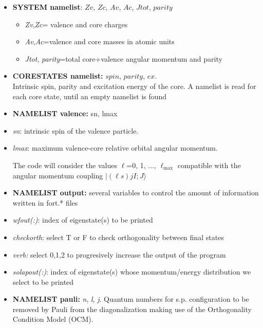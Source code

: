 \documentclass[preprint,12pt]{elsarticle}
\begin{document}
\begin{itemize}
\item \textbf{SYSTEM namelist}:  $Zv$, $Zc$, $Av$, $Ac$, $Jtot$, $parity$ 
\begin{itemize}
\item  {\it Zv},{\it Zc}= valence and core  charges
\item {\it Av},{\it Ac}=valence and core masses in atomic units
\item {\it Jtot}, {\it parity}=total core+valence angular momentum and parity
\end{itemize}



\item \textbf{CORESTATES namelist:} $spin$, $parity$, $ex$. \\ Intrinsic spin, parity and excitation energy of the core.
            A namelist is read for each core state, until an empty namelist is found \\

\item \textbf{NAMELIST valence:} sn, lmax
\bi
\item {\it sn}: intrinsic spin of the valence particle.
\item {\it lmax}: maximum valence-core relative orbital angular momentum. 
\ei
   
   The code will consider the values $\ell$=0, 1, $\ldots$, $\ell_\mathrm{max}$ compatible with the angular momentum coupling 
              $ | (\ell s) j I ; J \rangle $ 


\item \textbf{NAMELIST output:} several variables to control the amount of information written in fort.* files
\bi
\item {\em wfout(:)}: index of eigenstate(s) to be printed
\item {\em checkorth}: select T or F to check orthogonality between final states
\item {\em verb:} select 0,1,2 to progresively increase the output of the program
\item {\em solapout(:)}: index of eigenstate(s) whose momentum/energy distribution we select to be printed
\ei




\item \textbf{NAMELIST pauli:} {\it n}, {\it l}, {\it j}. Quantum numbers for s.p. configuration to be removed  by Pauli from the diagonalization making use of the Orthogonality Condition Model (OCM). 


\end{itemize}
\end{document}
